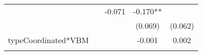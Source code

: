 \documentclass[12pt,twoside]{reedthesis}
\begin{document}
\begin{longtable}[]{@{}lcccc@{}}
\begin{minipage}[t]{0.12\columnwidth}
  \strut
  \end{minipage} & \begin{minipage}[t]{0.13\columnwidth}\centering\strut
  \strut
  \end{minipage} & \begin{minipage}[t]{0.14\columnwidth}\centering\strut
  -0.071\strut
  \end{minipage} & \begin{minipage}[t]{0.14\columnwidth}\centering\strut
  -0.170**\strut
  \end{minipage}\tabularnewline
  \begin{minipage}[t]{0.26\columnwidth}\raggedright\strut
  \strut
  \end{minipage} & \begin{minipage}[t]{0.12\columnwidth}\centering\strut
  \strut
  \end{minipage} & \begin{minipage}[t]{0.13\columnwidth}\centering\strut
  \strut
  \end{minipage} & \begin{minipage}[t]{0.14\columnwidth}\centering\strut
  (0.069)\strut
  \end{minipage} & \begin{minipage}[t]{0.14\columnwidth}\centering\strut
  (0.062)\strut
  \end{minipage}\tabularnewline
  \begin{minipage}[t]{0.26\columnwidth}\raggedright\strut
  typeCoordinated*VBM\strut
  \end{minipage} & \begin{minipage}[t]{0.12\columnwidth}\centering\strut
  \strut
  \end{minipage} & \begin{minipage}[t]{0.13\columnwidth}\centering\strut
  \strut
  \end{minipage} & \begin{minipage}[t]{0.14\columnwidth}\centering\strut
  -0.001\strut
  \end{minipage} & \begin{minipage}[t]{0.14\columnwidth}\centering\strut
  0.002\strut
  \end{minipage}\tabularnewline
  \begin{minipage}[t]{0.26\columnwidth}\raggedright\strut
  \strut
  \end{minipage} & \begin{minipage}[t]{0.12\columnwidth}\centering\strut
  \strut
  \end{minipage} & \begin{minipage}[t]{0.13\columnwidth}\centering\strut

\end{minipage}
\end{longtable}
\end{document}
